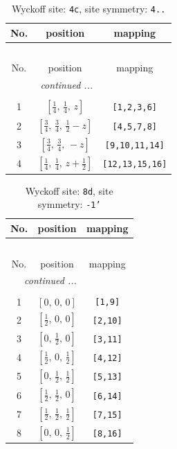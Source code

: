 \documentclass[fleqn,8pt]{jsarticle}
\begin{document}
\renewcommand{\arraystretch}{1.2}
\begin{longtable}{ccc}
\caption{Wyckoff site: {\tt 4c}, site symmetry: {\tt 4..}}
 \\
 \hline \hline
No. & position & mapping \\ \hline \endfirsthead

\multicolumn{2}{l}{\tablename\ \thetable{}} \\
 \hline \hline
No. & position & mapping \\ \hline \endhead

 \hline \hline
\multicolumn{2}{r}{\footnotesize\it continued ...} \\ \endfoot

 \hline \hline
\multicolumn{2}{r}{} \\ \endlastfoot

1 & $\left[ \frac{1}{4},\, \frac{1}{4},\, z \right]$ & {\tt [1,2,3,6]} \\ \hline
2 & $\left[ \frac{3}{4},\, \frac{3}{4},\, \frac{1}{2} - z \right]$ & {\tt [4,5,7,8]} \\ \hline
3 & $\left[ \frac{3}{4},\, \frac{3}{4},\, - z \right]$ & {\tt [9,10,11,14]} \\ \hline
4 & $\left[ \frac{1}{4},\, \frac{1}{4},\, z + \frac{1}{2} \right]$ & {\tt [12,13,15,16]} \\
\end{longtable}
\renewcommand{\arraystretch}{1.2}
\begin{longtable}{ccc}
\caption{Wyckoff site: {\tt 8d}, site symmetry: {\tt -1'}}
 \\
 \hline \hline
No. & position & mapping \\ \hline \endfirsthead

\multicolumn{2}{l}{\tablename\ \thetable{}} \\
 \hline \hline
No. & position & mapping \\ \hline \endhead

 \hline \hline
\multicolumn{2}{r}{\footnotesize\it continued ...} \\ \endfoot

 \hline \hline
\multicolumn{2}{r}{} \\ \endlastfoot

1 & $\left[ 0,\, 0,\, 0 \right]$ & {\tt [1,9]} \\ \hline
2 & $\left[ \frac{1}{2},\, 0,\, 0 \right]$ & {\tt [2,10]} \\ \hline
3 & $\left[ 0,\, \frac{1}{2},\, 0 \right]$ & {\tt [3,11]} \\ \hline
4 & $\left[ \frac{1}{2},\, 0,\, \frac{1}{2} \right]$ & {\tt [4,12]} \\ \hline
5 & $\left[ 0,\, \frac{1}{2},\, \frac{1}{2} \right]$ & {\tt [5,13]} \\ \hline
6 & $\left[ \frac{1}{2},\, \frac{1}{2},\, 0 \right]$ & {\tt [6,14]} \\ \hline
7 & $\left[ \frac{1}{2},\, \frac{1}{2},\, \frac{1}{2} \right]$ & {\tt [7,15]} \\ \hline
8 & $\left[ 0,\, 0,\, \frac{1}{2} \right]$ & {\tt [8,16]} \\
\end{longtable}
\end{document}
